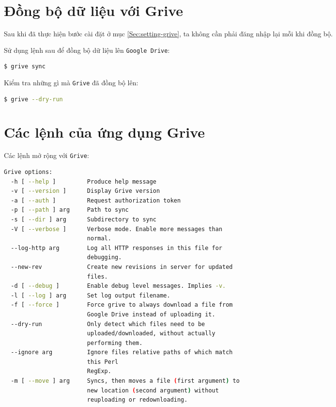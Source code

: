\section{Đồng bộ dữ liệu với Grive}
\begin{list}{--}{}
\item Sau khi đã thực hiện bước cài đặt ở mục  \ref{Sec:setting-grive}, ta không cần phải đăng nhập lại mỗi khi đồng bộ.
\item Sử dụng lệnh sau để đồng bộ dữ liệu lên \verb|Google Drive|:
\begin{lstlisting}[language=bash]
$ grive sync
\end{lstlisting}
\item Kiểm tra những gì mà \verb|Grive| đã đồng bộ lên:
\begin{lstlisting}[language=bash]
$ grive --dry-run
\end{lstlisting}
\end{list}
\section{Các lệnh của ứng dụng Grive}
\begin{list}{--}{}
\item[] Các lệnh mở rộng với \verb|Grive|:
\begin{lstlisting}[language=bash]
Grive options:
  -h [ --help ]         Produce help message
  -v [ --version ]      Display Grive version
  -a [ --auth ]         Request authorization token
  -p [ --path ] arg     Path to sync
  -s [ --dir ] arg      Subdirectory to sync
  -V [ --verbose ]      Verbose mode. Enable more messages than 
                        normal.
  --log-http arg        Log all HTTP responses in this file for 
                        debugging.
  --new-rev             Create new revisions in server for updated 
                        files.
  -d [ --debug ]        Enable debug level messages. Implies -v.
  -l [ --log ] arg      Set log output filename.
  -f [ --force ]        Force grive to always download a file from 
                        Google Drive instead of uploading it.
  --dry-run             Only detect which files need to be 
                        uploaded/downloaded, without actually 
                        performing them.
  --ignore arg          Ignore files relative paths of which match 
                        this Perl 
                        RegExp.
  -m [ --move ] arg     Syncs, then moves a file (first argument) to                                     
                        new location (second argument) without 
                        reuploading or redownloading.

\end{lstlisting}
\end{list}